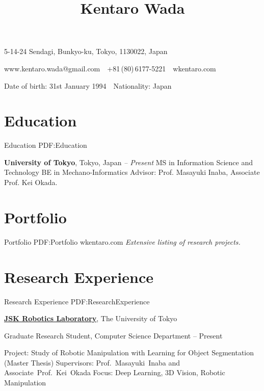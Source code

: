 \documentclass[letterpaper,MMMyyyy,nonstop]{simpleresumecv}
\newcommand{\CVAuthor}{Kentaro Wada}
\newcommand{\CVWebpage}{wkentaro.com}
\begin{document}

\title{\CVAuthor}

\begin{subtitle}
5-14-24 Sendagi, Bunkyo-ku, Tokyo, 1130022, Japan
\par
www.kentaro.wada@gmail.com
\,\SubBulletSymbol\,
+81\,(80)\,6177-5221
\,\SubBulletSymbol\,
\CVWebpage
\par
Date of birth: 31st January 1994
\,\SubBulletSymbol\,
Nationality: Japan

\noindent\makebox[\linewidth]{\rule{0.85\paperwidth}{0.4pt}}
\end{subtitle}

\begin{body}


\section
{Education}
{Education}
{PDF:Education}

\textbf{University of Tokyo}, Tokyo, Japan
\hfill
{\it {} -- Present}
\newline
MS in Information Science and Technology
\newline
BE in Mechano-Informatics
\newline
Advisor: Prof. Masayuki Inaba, Associate Prof. Kei Okada.


\section
{Portfolio}
{Portfolio}
{PDF:Portfolio}
\CVWebpage
\newline
{\it Extensive listing of research projects.}


\section
{Research Experience}
{Research Experience}
{PDF:ResearchExperience}

\href{http://www.jsk.t.u-tokyo.ac.jp/}
{\textbf{JSK Robotics Laboratory}},
The University of Tokyo

\GapNoBreak
\BulletItem
Graduate Research Student, Computer Science Department
\hfill
{} --
Present
\begin{detail}
\SubBulletItem
Project:
Study of Robotic Manipulation with Learning for Object Segmentation (Master Thesis)
\SubBulletItem
Supervisors:
Prof.~Masayuki~Inaba and Associate~Prof.~Kei~Okada
\SubBulletItem
Focus:
Deep Learning, 3D Vision, Robotic Manipulation
\end{detail}


\end{body}
\end{document}
